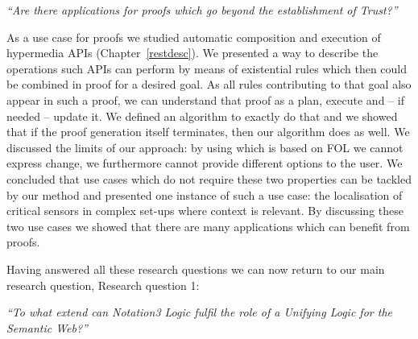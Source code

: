 
\textit{ 
``Are there applications for \nthree proofs which go beyond the establishment of \emph{Trust}?''
}

As a use case for \nthree proofs we studied automatic composition and execution of hypermedia APIs (Chapter~\ref{restdesc}). We presented a way 
to describe the operations such APIs can perform by means of existential rules which then could be combined in proof for a desired goal. 
As all rules contributing to that goal also appear in such a proof, we can understand that proof as a plan, execute and -- if needed -- update it.
We defined an algorithm to exactly do that and we showed that if the proof generation itself terminates, then our algorithm does as well.
We discussed the limits of our approach: by using \nthree which is based on FOL we cannot express change, we furthermore cannot provide different options to the user.
We concluded that use cases which do not require these two properties can be tackled by our method and presented one instance of such a use case: the localisation of critical 
sensors in complex set-ups where context is relevant. By discussing these two use cases we showed that there are many applications which can benefit from \nthree proofs.

Having answered all these research questions we can now return to our main research question, Research question 1:

\textit{ 
``To what extend can Notation3 Logic fulfil the role of a \emph{Unifying Logic} for the Semantic Web?''
}

